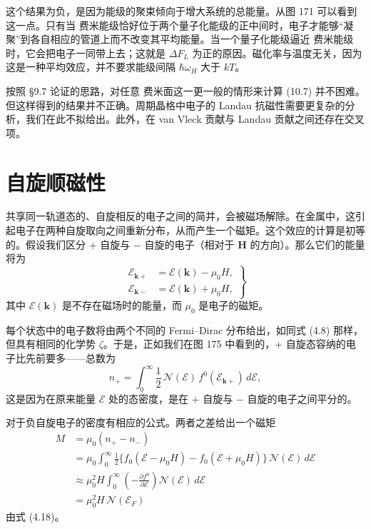这个结果为负，是因为能级的聚束倾向于增大系统的总能量。从图 171 可以看到这一点。只有当 费米能级恰好位于两个量子化能级的正中间时，电子才能够“凝聚”到各自相应的管道上而不改变其平均能量。当一个量子化能级逼近 费米能级时，它会把电子一同带上去；这就是 $\Delta F_{L}$ 为正的原因。磁化率与温度无关，因为这是一种平均效应，并不要求能级间隔 $\hbar\omega_{H}$ 大于 $kT$。

按照 §9.7 论证的思路，对任意 费米面这一更一般的情形来计算 (10.7) 并不困难。但这样得到的结果并不正确。周期晶格中电子的 Landau 抗磁性需要更复杂的分析，我们在此不拟给出。此外，在 van Vleck 贡献与 Landau 贡献之间还存在交叉项。

\section{自旋顺磁性}

共享同一轨道态的、自旋相反的电子之间的简并，会被磁场解除。在金属中，这引起电子在两种自旋取向之间重新分布，从而产生一个磁矩。这个效应的计算是初等的。假设我们区分 + 自旋与 $-$ 自旋的电子（相对于 $\mathbf{H}$ 的方向）。那么它们的能量将为
\begin{equation*}
\left.\begin{aligned}
\mathcal{E}_{\mathbf{k}+} &= \mathcal{E}(\mathbf{k})-\mu_{0}H,\\
\mathcal{E}_{\mathbf{k}-} &= \mathcal{E}(\mathbf{k})+\mu_{0}H,
\end{aligned}\right\}
\tag{10.9}
\end{equation*}
其中 $\mathcal{E}(\mathbf{k})$ 是不存在磁场时的能量，而 $\mu_{0}$ 是电子的磁矩。

每个状态中的电子数将由两个不同的 Fermi--Dirac 分布给出，如同式 (4.8) 那样，但具有相同的化学势 $\zeta$。于是，正如我们在图 175 中看到的，+ 自旋态容纳的电子比先前要多——总数为
\begin{equation*}
n_{+}=\int_{0}^{\infty}\frac{1}{2}\,\mathcal{N}(\mathcal{E})\,f^{0}(\mathcal{E}_{\mathbf{k}+})\,d\mathcal{E},
\tag{10.10}
\end{equation*}
这是因为在原来能量 $\mathcal{E}$ 处的态密度，是在 + 自旋与 $-$ 自旋的电子之间平分的。


对于负自旋电子的密度有相应的公式。两者之差给出一个磁矩
\begin{align*}
M &=\mu_{0}(n_{+}-n_{-})\\
&=\mu_{0}\int_{0}^{\infty}\tfrac{1}{2}\{f_{0}(\mathcal{E}-\mu_{0}H)-f_{0}(\mathcal{E}+\mu_{0}H)\}\,\mathcal{N}(\mathcal{E})\,d\mathcal{E}\\
&\approx\mu_{0}^{2}H\int_{0}^{\infty}\left(-\frac{\partial f^{0}}{\partial\mathcal{E}}\right)\mathcal{N}(\mathcal{E})\,d\mathcal{E}\\
&=\mu_{0}^{2}H\,\mathcal{N}(\mathcal{E}_{F})
\tag{10.11}
\end{align*}
由式 (4.18)。

